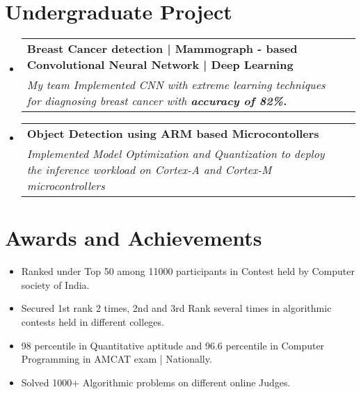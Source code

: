 \documentclass[letterpaper,11pt]{article}
\makeatletter
\newcommand{\resumeItem}[2]{
  \item\small{
    \textbf{#1}{ #2 \vspace{-2pt}}
  }
}
\newcommand{\EducationFormat}[4]{
  \vspace{-1pt}\item
    \begin{tabular*}{0.97\textwidth}[t]{l@{\extracolsep{\fill}}r}
      \textbf{\small#1} & #2 \\
      \textit{\small#3} & \textit{\small #4} \\
    \end{tabular*}\vspace{-5pt}
}
\newcommand{\resumeSubItem}[2]{\resumeItem{#1}{#2}\vspace{-4pt}}
\newcommand{\resumeSubHeadingListStart}{\begin{itemize}[leftmargin=*]}
\newcommand{\resumeSubHeadingListEnd}{\end{itemize}}
\makeatother
\begin{document}
\section{Undergraduate Project}
\resumeSubHeadingListStart
  \EducationFormat
  {Breast Cancer detection \big| Mammograph - based
  Convolutional Neural Network \big| Deep Learning}{}
  {My team Implemented CNN with extreme learning techniques for diagnosing breast cancer with  \textbf{accuracy of 82\%.}}
  {}
  \vspace{-4pt}
  \EducationFormat
  { Object Detection using ARM based Microcontollers \big}{}
  { Implemented Model Optimization and Quantization to deploy the inference workload on Cortex-A and Cortex-M microcontrollers}
  {}

\resumeSubHeadingListEnd
\section{Awards and Achievements}
\resumeSubHeadingListStart
\resumeSubItem{}{Ranked under Top 50 among 11000 participants in Contest held by
Computer society of India.}
\resumeSubItem{}{Secured 1st rank 2 times, 2nd and 3rd Rank several times in algorithmic
contests held in different colleges.}
\resumeSubItem{}{98 percentile in Quantitative aptitude and 96.6 percentile in
Computer Programming in AMCAT exam \big| Nationally.}
\resumeSubItem{}{Solved 1000+ Algorithmic problems on different online Judges.}
\resumeSubHeadingListEnd
\end{document}
